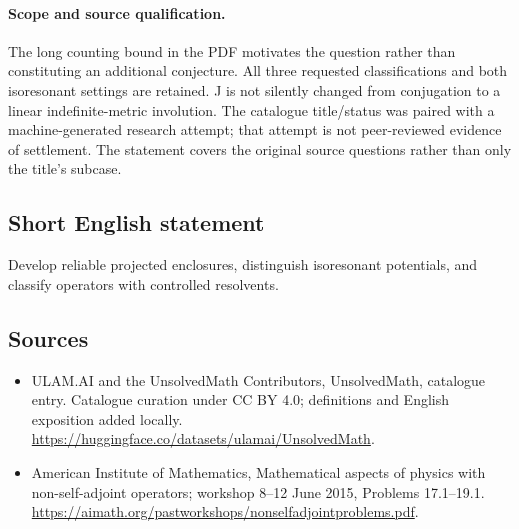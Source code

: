 \documentclass[11pt]{article}
\begin{document}
\paragraph{Scope and source qualification.}The long counting bound in the PDF motivates the question rather than constituting an additional conjecture. All three requested classifications and both isoresonant settings are retained. J is not silently changed from conjugation to a linear indefinite-metric involution. The catalogue title/status was paired with a machine-generated research attempt; that attempt is not peer-reviewed evidence of settlement. The statement covers the original source questions rather than only the title’s subcase.
\subsection{Short English statement}
Develop reliable projected enclosures, distinguish isoresonant potentials, and classify operators with controlled resolvents.
\subsection{Sources}
\begin{itemize}
\item[\hypertarget{source:statement:1}{S1}] ULAM.AI and the UnsolvedMath Contributors, UnsolvedMath, catalogue entry. Catalogue curation under CC BY 4.0; definitions and English exposition added locally.
\url{https://huggingface.co/datasets/ulamai/UnsolvedMath}.
\item[\hypertarget{source:statement:2}{S2}] American Institute of Mathematics, Mathematical aspects of physics with non-self-adjoint operators; workshop 8–12 June 2015, Problems 17.1–19.1.
\url{https://aimath.org/pastworkshops/nonselfadjointproblems.pdf}.
\end{itemize}
\label{end:statement}
\end{document}
